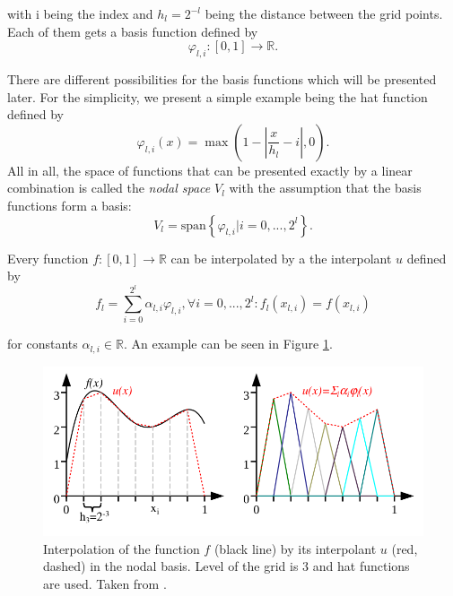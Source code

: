 with i being the index and $ h_l = 2^{-l} $ being the distance between the grid points. Each of them gets a basis function defined by 
\begin{equation}
	\varphi_{l,i}: [0,1] \rightarrow \mathbb{R}.
\end{equation}

There are different possibilities for the basis functions which will be presented later. For the simplicity, we present a simple example being the hat function defined by
\begin{equation}
	\varphi_{l,i}(x) = \max\left(1- \left|\frac{x}{h_l}-i\right|, 0\right).
\end{equation}
All in all, the space of functions that can be presented exactly by a linear combination is called the \textit{nodal space} $V_l$ with the assumption that the basis functions form a basis:
\begin{equation}
	V_l = \text{span}\left\{ \varphi_{l,i} | i = 0,...,2^l\right\}. 
\end{equation}

Every function $f: [0,1] \rightarrow \mathbb{R}$ can be interpolated by a the interpolant $ u $ defined by
\begin{equation}
	f_l = \sum_{i=0}^{2^l}\alpha_{l,i} \varphi_{l,i}, \forall i = 0,...,2^l: f_l(x_{l,i}) = f(x_{l,i})
\end{equation}

for constants $ \alpha_{l,i} \in \mathbb{R} $. An example can be seen in Figure \ref{fig:interpolant}.

\begin{figure}[ht]
	\centering
	\includegraphics[scale=0.5]{figures/weighted_sum.png}
	\caption{ Interpolation of the function $ f $ (black line) by its interpolant $ u $ (red, dashed) in the nodal basis. Level of the grid is 3 and hat functions are used. Taken from \cite{pfluger2010spatially}. }
	\label{fig:interpolant}
\end{figure}


